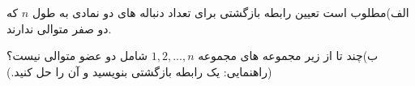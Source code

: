 \exercise
الف)مطلوب است تعیین رابطه بازگشتی برای تعداد دنباله های دو نمادی به طول
$n$
که دو صفر متوالی ندارند.

ب)چند تا از زیر مجموعه های مجموعه
${1, 2, ..., n}$
شامل دو عضو متوالی نیست؟
(راهنمایی: یک رابطه بازگشتی بنویسید و آن را حل کنید.)